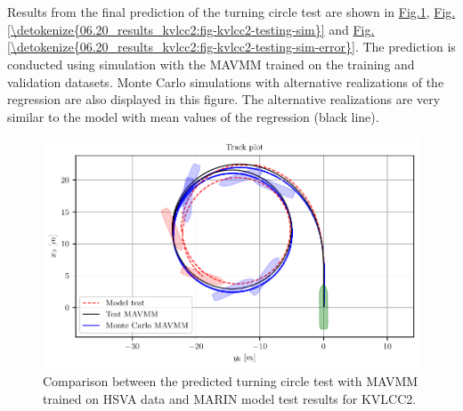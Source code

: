 \section*{}
\vspace{-1cm}
\noindent Results from the final prediction of the turning circle test are shown in  \hyperref[\detokenize{06.20_results_kvlcc2:fig-kvlcc2-track-plot-testing-sim}]{Fig.\@ \ref{\detokenize{06.20_results_kvlcc2:fig-kvlcc2-track-plot-testing-sim}}}, \hyperref[\detokenize{06.20_results_kvlcc2:fig-kvlcc2-testing-sim}]{Fig.\@ \ref{\detokenize{06.20_results_kvlcc2:fig-kvlcc2-testing-sim}}} and \hyperref[\detokenize{06.20_results_kvlcc2:fig-kvlcc2-testing-sim-error}]{Fig.\@ \ref{\detokenize{06.20_results_kvlcc2:fig-kvlcc2-testing-sim-error}}}. The prediction is conducted using simulation with the MAVMM trained on the training and validation datasets. Monte Carlo simulations with alternative realizations of the regression are also displayed in this figure. The alternative realizations are very similar to the model with mean values of the regression (black line).
\begin{figure}[h!]
\centering
\includegraphics[width=1.0\textwidth]{kappa/images/17.pdf}
\caption{Comparison between the predicted turning circle test with MAVMM trained on HSVA data and MARIN model test results for KVLCC2.}\label{\detokenize{06.20_results_kvlcc2:fig-kvlcc2-track-plot-testing-sim}}\end{figure}

